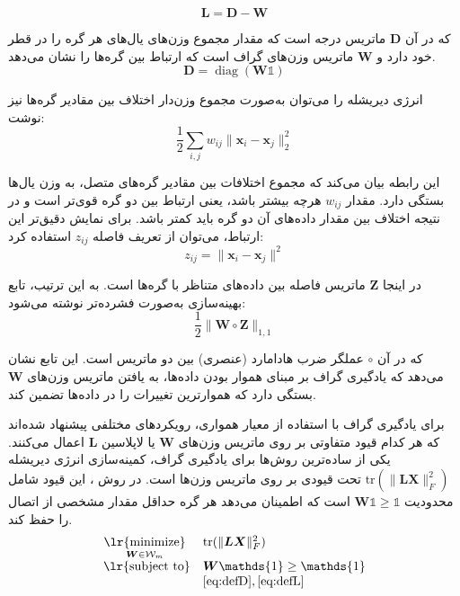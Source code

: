 \documentclass[10pt,twocolumn,a4paper]{article}
\newcommand\minimize[1]{\mathop{\text{\lr{minimize}}}\limits_{#1}\ }
\begin{document}
\begin{equation}\label{eq:defL}
	     \bm{L} = \bm{D} - \bm{W}
\end{equation}
     
     که در آن \( \bm{D} \) ماتریس درجه است که مقدار مجموع وزن‌های یال‌های هر گره را در قطر خود دارد و \( \bm{W} \) ماتریس وزن‌های گراف است که ارتباط بین گره‌ها را نشان می‌دهد.
     \begin{equation}\label{eq:defD}
     	\bm{D} = \operatorname{diag}(\bm{W}\mathds{1})
     \end{equation}
     
      انرژی دیریشله را می‌توان به‌صورت مجموع وزن‌دار اختلاف بین مقادیر گره‌ها نیز نوشت:
  \begin{equation}
  	     \frac{1}{2} \sum_{i,j} w_{ij} \|\bm{x}_i - \bm{x}_j\|_2^2
  \end{equation}
     
     این رابطه بیان می‌کند که مجموع اختلافات بین مقادیر گره‌های متصل، به وزن یال‌ها بستگی دارد. مقدار \( w_{ij} \) هرچه بیشتر باشد، یعنی ارتباط بین دو گره قوی‌تر است و در نتیجه اختلاف بین مقدار داده‌های آن دو گره باید کمتر باشد. برای نمایش دقیق‌تر این ارتباط، می‌توان از تعریف فاصله \( z_{ij} \) استفاده کرد:
\begin{equation}
	     z_{ij} = \|\bm{x}_i - \bm{x}_j\|^2
\end{equation}
     
     در اینجا \( \bm{Z} \) ماتریس فاصله بین داده‌های متناظر با گره‌ها است. به این ترتیب، تابع بهینه‌سازی به‌صورت فشرده‌تر نوشته می‌شود:
\begin{equation}
	     \frac{1}{2} \| \bm{W} \circ \bm{Z} \|_{1,1}
\end{equation}
     
     که در آن \( \circ \) عملگر ضرب هادامارد (عنصری) بین دو ماتریس است. این تابع نشان می‌دهد که یادگیری گراف بر مبنای هموار بودن داده‌ها، به یافتن ماتریس وزن‌های \( \bm{W} \) بستگی دارد که هموارترین تغییرات را در داده‌ها تضمین کند.
     
     برای یادگیری گراف با استفاده از معیار همواری، رویکردهای مختلفی پیشنهاد شده‌اند که هر کدام قیود متفاوتی بر روی ماتریس وزن‌های \( \bm{W} \) یا لاپلاسین \( \bm{L} \) اعمال می‌کنند. یکی از ساده‌ترین روش‌ها برای یادگیری گراف، کمینه‌سازی انرژی دیریشله \( \text{tr}(\|\bm{L} \bm{X}\|^2_F) \) تحت قیودی بر روی ماتریس وزن‌ها است.
     در روش \cite{Daitch2009}، این قیود شامل محدودیت \( \bm{W} \mathds{1} \geq \mathds{1} \) است که اطمینان می‌دهد هر گره حداقل مقدار مشخصی از اتصال را حفظ کند. 
     \begin{equation}
     		\begin{array}{cl}
     			\minimize{\bm{W}\in\mathcal{W}_m} & \text{tr}(\|\bm{L} \bm{X}\|^2_F) \\
     			\text{\lr{subject to}} & \bm{W} \mathds{1} \ge \mathds{1} \\
     			& \eqref{eq:defD}, \eqref{eq:defL}
     		\end{array}
     \end{equation}
     
\end{document}
